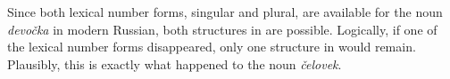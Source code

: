 \documentclass[output=paper,
modfonts,
newtxmath,
hidelinks
]{langscibook}
\begin{document}
{\noindent Since both lexical number forms, singular and plural, are available for the noun \textit{devočka} in modern Russian, both structures in  are possible. Logically, if one of the lexical number forms disappeared, only one structure in  would remain. Plausibly, this is exactly what happened to the noun \textit{čelovek}.}

\ea \label{18:ex6}
	\z 
\z


\ea \label{18:ex7}
	\z
\z
\end{document}
